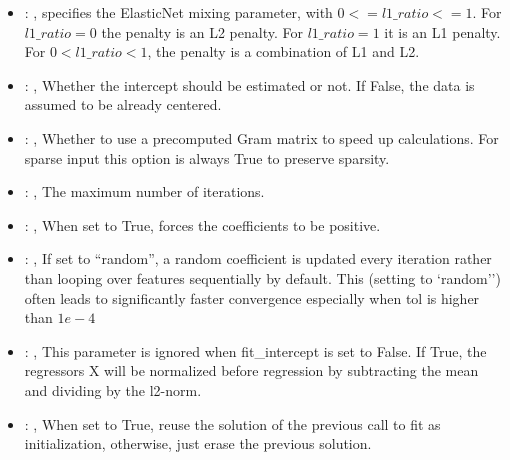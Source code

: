 \begin{itemize}
    \item {}: , 
      specifies the                                                  ElasticNet mixing parameter,
      with $0 <= l1\_ratio <= 1$.                                                  For $l1\_ratio =
      0$ the penalty is an L2 penalty.                                                  For
      $l1\_ratio = 1$ it is an L1 penalty.                                                  For $0 <
      l1\_ratio < 1$, the penalty is a combination of L1 and L2.

    \item {}: , 
      Whether the intercept should be estimated or not. If False,
      the data is assumed to be already centered.

    \item {}: , 
      Whether to use a precomputed Gram matrix to speed up calculations.
      For sparse input this option is always True to preserve sparsity.

    \item {}: , 
      The maximum number of iterations.

    \item {}: , 
      When set to True, forces the coefficients to be positive.

    \item {}: , 
      If set to ``random'', a random coefficient is updated every iteration
      rather than looping over features sequentially by default. This (setting to `random'')
      often leads to significantly faster convergence especially when tol is higher than $1e-4$

    \item {}: , 
      This parameter is ignored when fit\_intercept is set to False. If True,
      the regressors X will be normalized before regression by subtracting the mean and
      dividing by the l2-norm.

    \item {}: , 
      When set to True, reuse the solution of the previous call
      to fit as initialization, otherwise, just erase the previous solution.
  \end{itemize}


